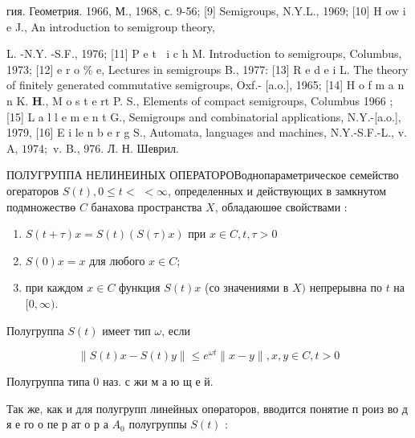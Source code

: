 \documentclass[10pt]{article}
\begin{document}
гия. Геометрия. 1966, М., 1968, с. 9-56; [9] Semigroups, N.Y.L., 1969; [10] H ow i e J., An introduction to semigroup theory,

L. -N.Y. -S.F., 1976; [11] P e t $\mathbf{~}$ i c h M. Introduction to semigroups, Columbus, 1973; [12] e r o $\%$ e, Lectures in semigroups B., 1977: [13] R e d e i L. The theory of finitely generated commutative semigroups, Oxf.- [a.o.], 1965; [14] H o f m a n n K. $\mathbf{H}$., M o s t e $\mathrm{r} \mathrm{t}$ P. S., Elements of compact semigroups, Columbus 1966 ; [15] L a l l e m e n t G., Semigroups and combinatorial applications, N.Y.-[a.o.], 1979, [16] E i le n b e r g S., Automata, languages and machines, N.Y.-S.F.-L., v. A, $1974 ;$ v. B., 976. Л. Н. Шеврил.



ПОЛУГРУППА НЕЛИНЕИНЫХ ОПЕРАТОРОВоднопараметрическое семейство огераторов $S(t), 0 \leqslant t<$ $<\infty$, определенных и действующих в замкнутом подмножествө $C$ банахова пространства $X$, обладаюшөе свойствами :



\begin{enumerate}

  \item $S(t+\tau) x=S(t)(S(\tau) x)$ при $x \in C, t, \tau>0$



  \item $S(0) x=x$ для любого $x \in C$;



  \item при каждом $x \in C$ функция $S(t) x$ (со значениями в $X)$ непрерывна по $t$ на $[0, \infty)$.



\end{enumerate}



Полугруппа $S(t)$ имеет тип $\omega$, если



\[

\|S(t) x-S(t) y\| \leqslant e^{\omega t}\|x-y\|, x, y \in C, t>0

\]



Полугруппа типа 0 наз. с жи м а ю щ е й.



Так же, как и для полугрупп линейных опөраторов, вводится понятие п роиз во д я е го о пе р ат о р а $A_{0}$ полугруппы $S(t)$ :
\end{document}
